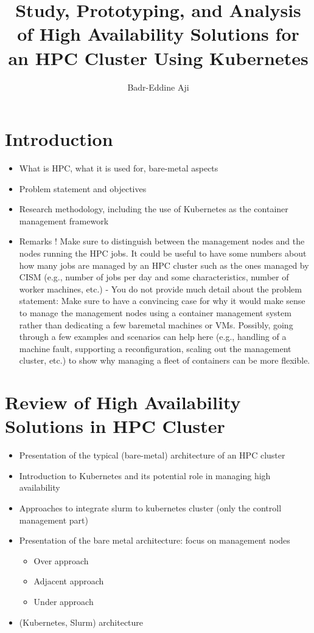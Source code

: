 \documentclass{article}
\title{Study, Prototyping, and Analysis of High Availability Solutions for an HPC Cluster Using Kubernetes}
\author{ Badr-Eddine Aji}
\date{}
\begin{document}
\maketitle

\section{Introduction}
\begin{itemize}
    \item What is HPC, what it is used for, bare-metal aspects
    \item Problem statement and objectives
    \item Research methodology, including the use of Kubernetes as the container management framework
\item Remarks ! Make sure to distinguish between the management nodes and the nodes running the HPC jobs. It could be useful to have some numbers about how many jobs are managed by an HPC cluster such as the ones managed by CISM (e.g., number of jobs per day and some characteristics, number of worker machines, etc.)
- You do not provide much detail about the problem statement: Make sure to have a convincing case for why it would make sense to manage the management nodes using a container management system rather than dedicating a few baremetal machines or VMs. Possibly, going through a few examples and scenarios can help here (e.g., handling of a machine fault, supporting a reconfiguration, scaling out the management cluster, etc.) to show why managing a fleet of containers can be more flexible.
\end{itemize}

\section{Review of High Availability Solutions in HPC Cluster }
\begin{itemize}
    \item Presentation of the typical (bare-metal) architecture of an HPC cluster
    \item Introduction to Kubernetes and its potential role in managing high availability
    \item Approaches to integrate slurm to kubernetes cluster (only the controll management part) 
    \item Presentation of the bare metal architecture: focus on management nodes
           \begin{itemize}
            \item Over approach
            \item Adjacent approach 
            \item Under approach
        \end{itemize}
    \item (Kubernetes, Slurm) architecture
\end{itemize}
\end{document}
